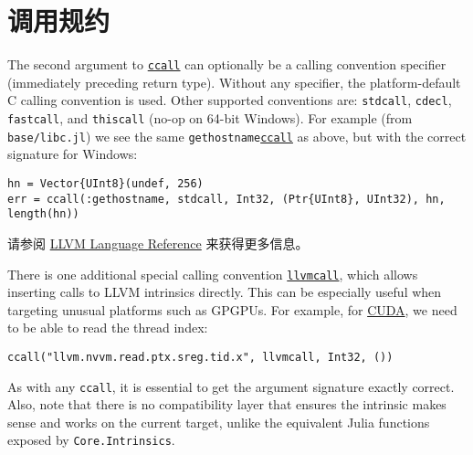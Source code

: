 \hypertarget{14242265699396110950}{}


\section{调用规约}



The second argument to \hyperlink{14245046751182637566}{\texttt{ccall}} can optionally be a calling convention specifier (immediately preceding return type). Without any specifier, the platform-default C calling convention is used. Other supported conventions are: \texttt{stdcall}, \texttt{cdecl}, \texttt{fastcall}, and \texttt{thiscall} (no-op on 64-bit Windows). For example (from \texttt{base/libc.jl}) we see the same \texttt{gethostname}\hyperlink{14245046751182637566}{\texttt{ccall}} as above, but with the correct signature for Windows:




\begin{verbatim}
hn = Vector{UInt8}(undef, 256)
err = ccall(:gethostname, stdcall, Int32, (Ptr{UInt8}, UInt32), hn, length(hn))
\end{verbatim}



请参阅 \href{http://llvm.org/docs/LangRef.html\#calling-conventions}{LLVM Language Reference} 来获得更多信息。



There is one additional special calling convention \hyperlink{12406828992589210838}{\texttt{llvmcall}}, which allows inserting calls to LLVM intrinsics directly. This can be especially useful when targeting unusual platforms such as GPGPUs. For example, for \href{http://llvm.org/docs/NVPTXUsage.html}{CUDA}, we need to be able to read the thread index:




\begin{verbatim}
ccall("llvm.nvvm.read.ptx.sreg.tid.x", llvmcall, Int32, ())
\end{verbatim}



As with any \texttt{ccall}, it is essential to get the argument signature exactly correct. Also, note that there is no compatibility layer that ensures the intrinsic makes sense and works on the current target, unlike the equivalent Julia functions exposed by \texttt{Core.Intrinsics}.



\hypertarget{6755654760318927882}{}



